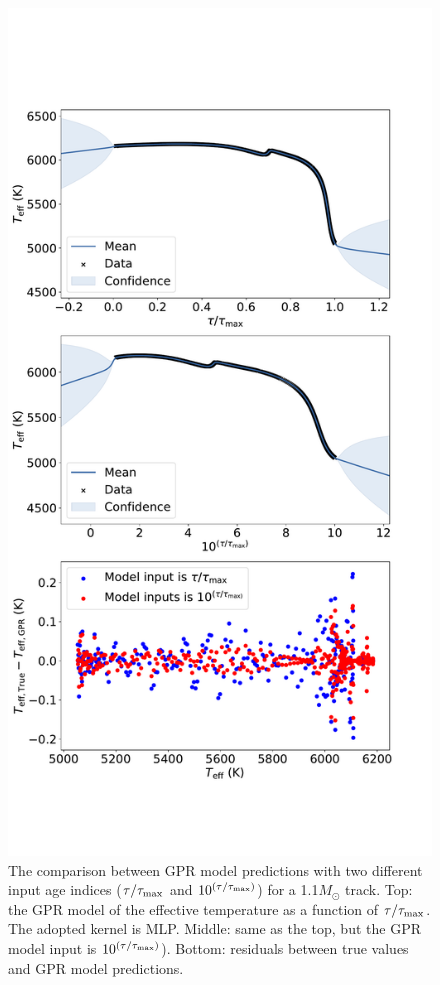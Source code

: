\begin{figure}
	\includegraphics[width=1.0\columnwidth]{selection_of_t.pdf}
    \caption{The comparison between GPR model predictions with two different input age indices ($\tau/\tau_{\rm max}$ and $10^{(\tau/\tau_{\rm max})}$) for a 1.1$M_{\odot}$ track. Top: the GPR model of the effective temperature as a function of $\tau/\tau_{\rm max}$. The adopted kernel is MLP. Middle: same as the top, but the GPR model input is $10^{(\tau/\tau_{\rm max})}$). Bottom: residuals between true values and GPR model predictions. }
    \label{fig:selection_of_t}
\end{figure}
 

